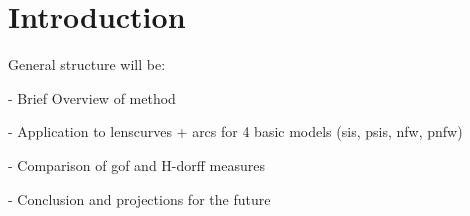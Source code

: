 \section{Introduction}

General structure will be:

- Brief Overview of method

- Application to lenscurves + arcs for 4 basic models (sis, psis, nfw, pnfw)

- Comparison of gof and H-dorff measures

- Conclusion and projections for the future

